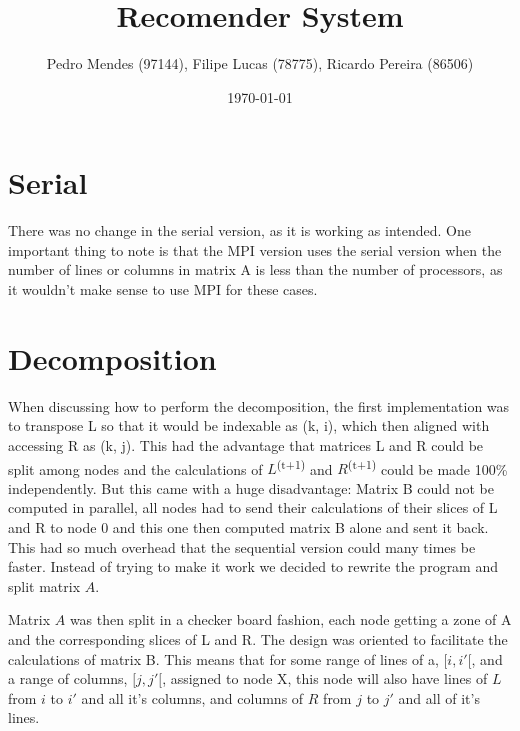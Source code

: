 \documentclass[a4paper]{article}
\begin{document}
\title{Recomender System}
\author{Pedro Mendes (97144), Filipe Lucas (78775), Ricardo Pereira (86506)}
\date{\today}
\maketitle


\section{Serial}
There was no change in the serial version, as it is working as intended. One
important thing to note is that the MPI version uses the serial version when the
number of lines or columns in matrix A is less than the number of processors, as
it wouldn't make sense to use MPI for these cases.

\section{Decomposition}\label{s:decomposition}
When discussing how to perform the decomposition, the first implementation was
to transpose L so that it would be indexable as (k, i), which then aligned with
accessing R as (k, j). This had the advantage that matrices L and R could be
split among nodes and the calculations of $L$\textsuperscript{(t+1)} and
$R$\textsuperscript{(t+1)} could be made 100\% independently.  But this came
with a huge disadvantage: Matrix B could not be computed in parallel, all nodes
had to send their calculations of their slices of L and R to node 0 and this one
then computed matrix B alone and sent it back. This had so much overhead that
the sequential version could many times be faster.  Instead of trying to make it
work we decided to rewrite the program and split matrix $A$.

Matrix $A$ was then split in a checker board fashion, each node getting a zone
of A and the corresponding slices of L and R. The design was oriented to
facilitate the calculations of matrix B. This means that for some range of lines
of a, $[i, i'[$, and a range of columns, $[j, j'[$, assigned to node X, this
node will also have lines of $L$ from $i$ to $i'$ and all it's columns, and
columns of $R$ from $j$ to $j'$ and all of it's lines.
\end{document}

